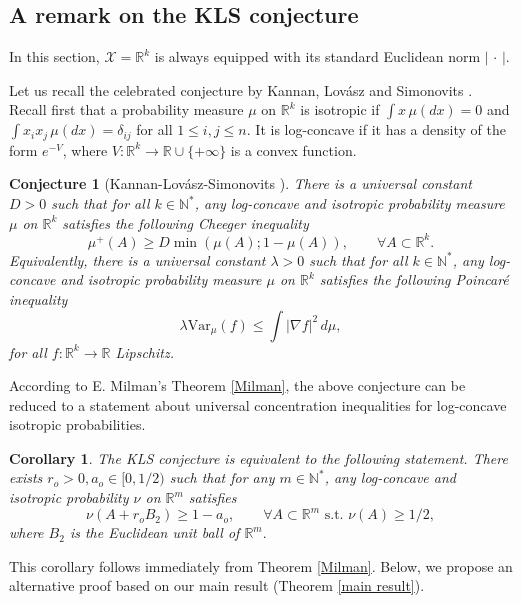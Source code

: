 \documentclass[11pt]{amsart}
\newtheorem{cor}[equation]{Corollary}
\newtheorem{conj}[equation]{Conjecture}
\numberwithin{equation}{section}
\begin{document}
\subsection{A remark on the KLS conjecture}
In this section, $\mathcal{X}={\mathbb{R}}^k$ is always equipped with its standard Euclidean norm $|\,\cdot\,|$.

Let us recall the celebrated conjecture by Kannan, Lov\'asz and Simonovits \cite{KLS95}.
Recall first that a probability measure $\mu$ on ${\mathbb{R}}^k$ is isotropic if $\int x\,\mu(dx)=0$ and $\int x_ix_j \,\mu(dx) =\delta_{ij}$ for all $1\leq i,j\leq n.$ It is log-concave if it has a density of the form $e^{-V}$, where $V:{\mathbb{R}}^k\to{\mathbb{R}}\cup\{+\infty\}$ is a convex function.

\begin{conj}[Kannan-Lov\'asz-Simonovits \cite{KLS95}]\label{KLS}
There is a universal constant $D>0$ such that for all $k\in {\mathbb{N}}^*$, any log-concave and isotropic probability measure $\mu$ on ${\mathbb{R}}^k$ satisfies the following Cheeger inequality 
\[
\mu^+(A)\geq D\min(\mu(A) ; 1-\mu(A)),\qquad \forall A \subset {\mathbb{R}}^k.
\]
Equivalently, there is a universal constant $\lambda>0$ such that for all $k\in {\mathbb{N}}^*$, any log-concave and isotropic probability measure $\mu$ on ${\mathbb{R}}^k$ satisfies the following Poincar\'e inequality
\[
\lambda\mathrm{Var}_\mu(f)\leq  \int |\nabla f|^2\,d\mu,
\]
for all $f:{\mathbb{R}}^k \to {\mathbb{R}}$ Lipschitz.
\end{conj}

According to E. Milman's Theorem \ref{Milman}, the above conjecture can be reduced to a statement about universal concentration inequalities for log-concave isotropic probabilities.

\begin{cor}\label{red KLS}
The KLS conjecture is equivalent to the following statement. There exists $r_o>0, a_o \in [0,1/2)$ such that for any $m\in {\mathbb{N}}^*$, any log-concave and isotropic probability $\nu$ on ${\mathbb{R}}^m$ satisfies 
\begin{equation}\label{KLS Milman}
\nu(A + r_o B_2) \geq 1-a_o,\qquad \forall A \subset {\mathbb{R}}^m \text{ s.t. } \nu(A)\geq1/2,
\end{equation}
where $B_2$ is the Euclidean unit ball of ${\mathbb{R}}^m.$
\end{cor}

This corollary follows immediately from Theorem \ref{Milman}. Below, we propose an alternative proof based on our main result (Theorem \ref{main result}).
\end{document}

